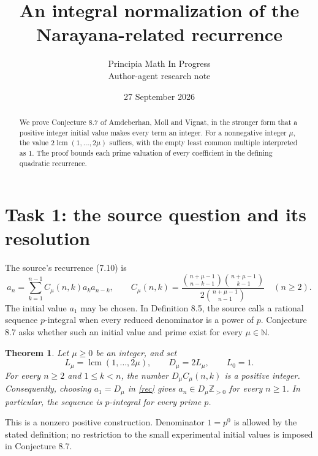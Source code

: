 \documentclass[11pt]{article}
\title{An integral normalization of the Narayana-related recurrence}
\author{Principia Math In Progress\\Author-agent research note}
\date{27 September 2026}
\newtheorem{theorem}{Theorem}
\DeclareMathOperator{\lcm}{lcm}
\begin{document}
\maketitle
\begin{abstract}
We prove Conjecture 8.7 of Amdeberhan, Moll and Vignat, in the stronger
form that a positive integer initial value makes every term an integer.
For a nonnegative integer $\mu$, the value
$2\lcm(1,\ldots,2\mu)$ suffices, with the empty least common multiple
interpreted as $1$. The proof bounds each prime valuation of every
coefficient in the defining quadratic recurrence.
\end{abstract}

\section*{Task 1: the source question and its resolution}
The source's recurrence (7.10) is
\begin{equation}\label{rec}
 a_n=\sum_{k=1}^{n-1} C_\mu(n,k)a_ka_{n-k},\qquad
 C_\mu(n,k)=
 \frac{\binom{n+\mu-1}{n-k-1}\binom{n+\mu-1}{k-1}}
 {2\binom{n+\mu-1}{n-1}}\quad(n\ge2).
\end{equation}
The initial value $a_1$ may be chosen. In Definition 8.5, the source calls
a rational sequence $p$-integral when every reduced denominator is a
power of $p$. Conjecture 8.7 asks whether such an initial value and prime
exist for every $\mu\in\mathbb N$.

\begin{theorem}\label{main}
Let $\mu\ge0$ be an integer, and set
\[
 L_\mu=\lcm(1,\ldots,2\mu),\qquad D_\mu=2L_\mu,
 \qquad L_0=1.
\]
For every $n\ge2$ and $1\le k<n$, the number $D_\mu C_\mu(n,k)$
is a positive integer. Consequently, choosing $a_1=D_\mu$ in
\eqref{rec} gives $a_n\in D_\mu\mathbb Z_{>0}$ for every $n\ge1$.
In particular, the sequence is $p$-integral for every prime $p$.
\end{theorem}

This is a nonzero positive construction. Denominator $1=p^0$ is allowed
by the stated definition; no restriction to the small experimental
initial values is imposed in Conjecture 8.7.
\end{document}
